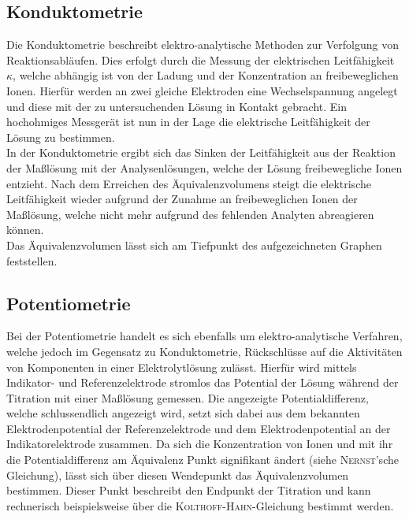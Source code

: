 \subsection*{Konduktometrie}
Die Konduktometrie beschreibt elektro-analytische Methoden zur Verfolgung von Reaktionsabläufen. Dies erfolgt durch die Messung der elektrischen Leitfähigkeit $\kappa$, welche abhängig ist von der Ladung und der Konzentration an freibeweglichen Ionen. Hierfür werden an zwei gleiche Elektroden eine Wechselspannung angelegt und diese mit der zu untersuchenden Lösung in Kontakt gebracht. Ein hochohmiges Messgerät ist nun in der Lage die elektrische Leitfähigkeit der Lösung zu bestimmen.\\
In der Konduktometrie ergibt sich das Sinken der Leitfähigkeit aus der Reaktion der Maßlösung mit der Analysenlösungen, welche der Lösung freibewegliche Ionen entzieht. Nach dem Erreichen des Äquivalenzvolumens steigt die elektrische Leitfähigkeit wieder aufgrund der Zunahme an freibeweglichen Ionen der Maßlösung, welche nicht mehr aufgrund des fehlenden Analyten abreagieren können.\cite{Holze.2012}\\
Das Äquivalenzvolumen lässt sich am Tiefpunkt des aufgezeichneten Graphen feststellen.

\subsection*{Potentiometrie}
Bei der Potentiometrie handelt es sich ebenfalls um elektro-analytische Verfahren, welche jedoch im Gegensatz zu Konduktometrie, Rückschlüsse auf die Aktivitäten von Komponenten in  einer Elektrolytlösung zulässt. Hierfür wird mittels Indikator- und Referenzelektrode stromlos das Potential der Lösung während der Titration mit einer Maßlösung gemessen. Die angezeigte Potentialdifferenz, welche schlussendlich angezeigt wird, setzt sich dabei aus dem bekannten Elektrodenpotential der Referenzelektrode und dem Elektrodenpotential an der Indikatorelektrode zusammen. Da sich die Konzentration von Ionen und mit ihr die Potentialdifferenz am Äquivalenz Punkt signifikant ändert (siehe \textsc{Nernst}'sche Gleichung), lässt sich über diesen Wendepunkt das Äquivalenzvolumen bestimmen. Dieser Punkt beschreibt den Endpunkt der Titration und kann rechnerisch beispielsweise über die \textsc{Kolthoff-Hahn}-Gleichung bestimmt werden.\cite{Brehm.2007}

